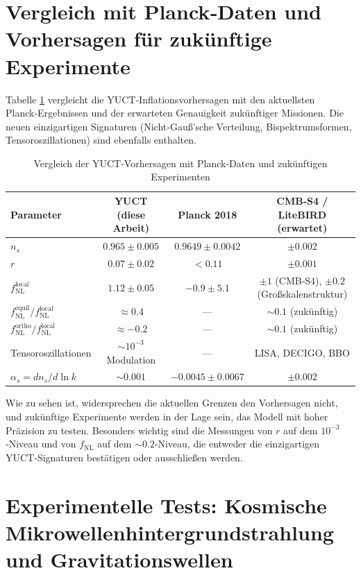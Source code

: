 \documentclass[12pt]{article}
\theoremstyle{remark}
\newcommand{\rs}{r}
\begin{document}
	\section{Vergleich mit Planck‑Daten und Vorhersagen für zukünftige Experimente}
	\label{sec:comparison}
	
	Tabelle \ref{tab:comparison} vergleicht die YUCT‑Inflationsvorhersagen mit den aktuellsten Planck‑Ergebnissen und der erwarteten Genauigkeit zukünftiger Missionen. Die neuen einzigartigen Signaturen (Nicht‑Gauß’sche Verteilung, Bispektrumsformen, Tensoroszillationen) sind ebenfalls enthalten.
	
	\begin{table}[htbp]
		\centering
		\caption{Vergleich der YUCT‑Vorhersagen mit Planck‑Daten und zukünftigen Experimenten}
		\label{tab:comparison}
		\begin{tabular}{lccc}
			\toprule
			\textbf{Parameter} & \textbf{YUCT (diese Arbeit)} & \textbf{Planck 2018} & \textbf{CMB‑S4 / LiteBIRD (erwartet)} \\
			\midrule
			$n_s$ & $0.965 \pm 0.005$ & $0.9649 \pm 0.0042$ & $\pm 0.002$ \\
			$\rs$ & $0.07 \pm 0.02$ & $<0.11$ & $\pm 0.001$ \\
			$f_{\mathrm{NL}}^{\mathrm{local}}$ & $1.12 \pm 0.05$ & $-0.9 \pm 5.1$ & $\pm 1$ (CMB‑S4), $\pm 0.2$ (Großskalenstruktur) \\
			$f_{\mathrm{NL}}^{\mathrm{equil}} / f_{\mathrm{NL}}^{\mathrm{local}}$ & $\approx 0.4$ & — & $\sim 0.1$ (zukünftig) \\
			$f_{\mathrm{NL}}^{\mathrm{ortho}} / f_{\mathrm{NL}}^{\mathrm{local}}$ & $\approx -0.2$ & — & $\sim 0.1$ (zukünftig) \\
			Tensoroszillationen & $\sim 10^{-3}$ Modulation & — & LISA, DECIGO, BBO \\
			$\alpha_s = dn_s/d\ln k$ & $\sim 0.001$ & $-0.0045 \pm 0.0067$ & $\pm 0.002$ \\
			\bottomrule
		\end{tabular}
	\end{table}
	
	Wie zu sehen ist, widersprechen die aktuellen Grenzen den Vorhersagen nicht, und zukünftige Experimente werden in der Lage sein, das Modell mit hoher Präzision zu testen. Besonders wichtig sind die Messungen von $r$ auf dem $10^{-3}$‑Niveau und von $f_{\text{NL}}$ auf dem $\sim 0.2$‑Niveau, die entweder die einzigartigen YUCT‑Signaturen bestätigen oder ausschließen werden.
	
	\section{Experimentelle Tests: Kosmische Mikrowellenhintergrundstrahlung und Gravitationswellen}
	\label{sec:tests}
	
\end{document}
